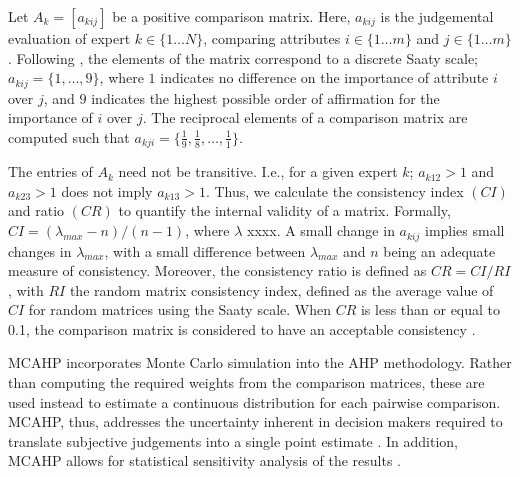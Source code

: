 \documentclass[a4paper]{article}
\begin{document}
Let $A_k=[a_{kij}]$ be a positive comparison matrix.
Here, $a_{kij}$ is the judgemental evaluation of expert $k \in \lbrace 1 \dots N \rbrace$, comparing attributes $i  \in \lbrace 1 \dots m \rbrace $ and $j  \in \lbrace 1 \dots m \rbrace$.
Following \citet{Saaty:1987}, the elements of the matrix correspond to a discrete Saaty scale; $a_{kij}=\lbrace 1,\dots,9\rbrace$, where $1$ indicates no difference on the importance of attribute $i$ over $j$, and $9$ indicates the highest possible order of affirmation for the importance of $i$ over $j$.
The reciprocal elements of a comparison matrix are computed such that $a_{kji}=\lbrace \frac{1}{9},\frac{1}{8},\dots,\frac{1}{1} \rbrace$.

The entries of $A_k$ need not be transitive. 
I.e., for a given expert $k$; $a_{k12}>1$ and $a_{k23}>1$ does not imply $a_{k13}>1$.
Thus, we calculate the consistency index $(CI)$ and ratio $(CR)$ to quantify the internal validity of a matrix.
Formally, $CI=(\lambda_{max}-n)/(n-1)$, where $\lambda$ xxxx. 
A small change in $a_{kij}$ implies small changes in $\lambda_{max}$, with a small difference between $\lambda_{max}$ and $n$ being an adequate measure of consistency. 
Moreover, the consistency ratio is defined as $CR=CI/RI$, with $RI$ the random matrix consistency index, defined as the average value of $CI$ for random matrices using the Saaty scale. 
When $CR$ is less than or equal to 0.1, the comparison matrix is considered to have an acceptable consistency \citep{Ishizaka:2011, Saaty:1987}.

MCAHP incorporates Monte Carlo simulation into the AHP methodology.
Rather than computing the required weights from the comparison matrices, these are used instead to estimate a continuous distribution for each pairwise comparison.
MCAHP, thus, addresses the uncertainty inherent in decision makers required to translate 
subjective judgements into a single point estimate \citep{Ataei:2013}.
In addition, MCAHP allows for statistical sensitivity analysis of the results \citep{Banuelas:2004, Vaidya:2006}. 
\end{document}
